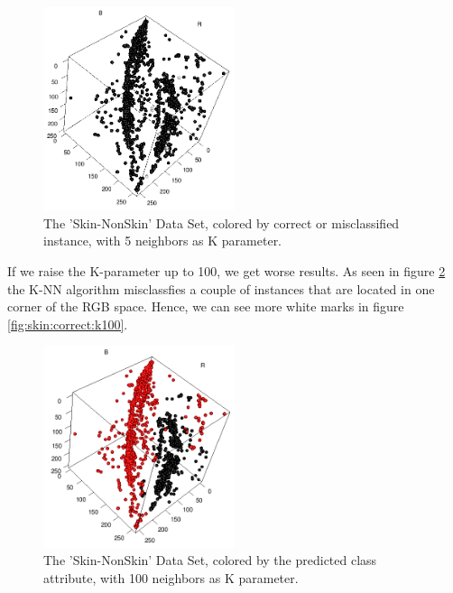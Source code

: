 \documentclass[paper=a4, fontsize=11pt]{scrartcl} %
\numberwithin{equation}{section} %
\numberwithin{figure}{section} %
\numberwithin{table}{section} %
\begin{document}
\begin{figure}[0.5\textwidth]
    \begin{center}
\includegraphics[width=0.5\textwidth]{Skin_correct_k5}
    \end{center}
\caption['Skin-NonSkin' correctness with k=5]{The 'Skin-NonSkin' Data Set, colored by correct or misclassified instance, with 5 neighbors as K parameter.}
\label{fig:skin:correct:k5}
\end{figure}

If we raise the K-parameter up to 100, we get worse results. As seen in figure \ref{fig:skin:predicted:k100} the K-NN algorithm misclassfies a couple of instances that are located in one corner of the RGB space. Hence, we can see more white marks in figure \ref{fig:skin:correct:k100}.

\begin{figure}[0.5\textwidth]
    \begin{center}
\includegraphics[width=0.5\textwidth]{Skin_predicted_k100}
    \end{center}
\caption['Skin-NonSkin' prediction with k=100]{The 'Skin-NonSkin' Data Set, colored by the predicted class attribute, with 100 neighbors as K parameter.}
\label{fig:skin:predicted:k100}
\end{figure}
\end{document}

